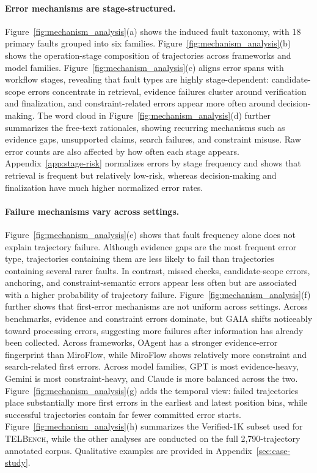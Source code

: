 \paragraph{Error mechanisms are stage-structured.}
Figure~\ref{fig:mechanism_analysis}(a) shows the induced fault taxonomy, with 18 primary faults grouped into six families. Figure~\ref{fig:mechanism_analysis}(b) shows the operation-stage composition of trajectories across frameworks and model families. Figure~\ref{fig:mechanism_analysis}(c) aligns error spans with workflow stages, revealing that fault types are highly stage-dependent: candidate-scope errors concentrate in retrieval, evidence failures cluster around verification and finalization, and constraint-related errors appear more often around decision-making. The word cloud in Figure~\ref{fig:mechanism_analysis}(d) further summarizes the free-text rationales, showing recurring mechanisms such as evidence gaps, unsupported claims, search failures, and constraint misuse. Raw error counts are also affected by how often each stage appears. Appendix~\ref{app:stage-risk} normalizes errors by stage frequency and shows that retrieval is frequent but relatively low-risk, whereas decision-making and finalization have much higher normalized error rates.

\paragraph{Failure mechanisms vary across settings.}
Figure~\ref{fig:mechanism_analysis}(e) shows that fault frequency alone does not explain trajectory failure. Although evidence gaps are the most frequent error type, trajectories containing them are less likely to fail than trajectories containing several rarer faults. In contrast, missed checks, candidate-scope errors, anchoring, and constraint-semantic errors appear less often but are associated with a higher probability of trajectory failure. Figure~\ref{fig:mechanism_analysis}(f) further shows that first-error mechanisms are not uniform across settings. Across benchmarks, evidence and constraint errors dominate, but GAIA shifts noticeably toward processing errors, suggesting more failures after information has already been collected. Across frameworks, OAgent has a stronger evidence-error fingerprint than MiroFlow, while MiroFlow shows relatively more constraint and search-related first errors. Across model families, GPT is most evidence-heavy, Gemini is most constraint-heavy, and Claude is more balanced across the two. Figure~\ref{fig:mechanism_analysis}(g) adds the temporal view: failed trajectories place substantially more first errors in the earliest and latest position bins, while successful trajectories contain far fewer committed error starts. Figure~\ref{fig:mechanism_analysis}(h) summarizes the Verified-1K subset used for \textsc{TELBench}, while the other analyses are conducted on the full 2,790-trajectory annotated corpus. Qualitative examples are provided in Appendix~\ref{sec:case-study}.